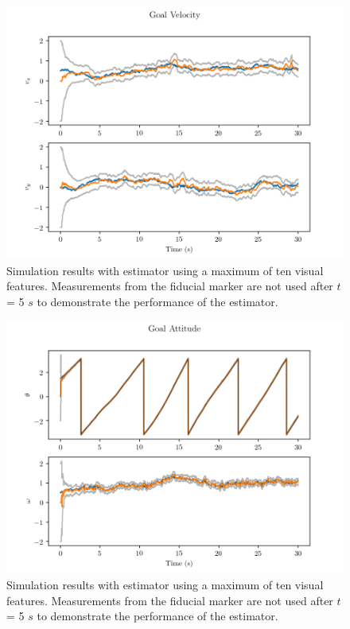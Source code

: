 \begin{figure}
  \centering
  \includegraphics[scale=0.5]{plots/with_lms_gv.png}
  \caption{Simulation results with estimator using a maximum of ten visual
  features. Measurements from the fiducial marker are not used after $t$ = 5
$s$ to demonstrate the performance of the estimator.}
  \label{fig:with_lms_gv}
\end{figure}

\begin{figure}
  \centering
  \includegraphics[scale=0.5]{plots/with_lms_gatt.png}
  \caption{Simulation results with estimator using a maximum of ten visual
  features. Measurements from the fiducial marker are not used after $t$ = 5
$s$ to demonstrate the performance of the estimator.}
  \label{fig:with_lms_gatt}
\end{figure}


